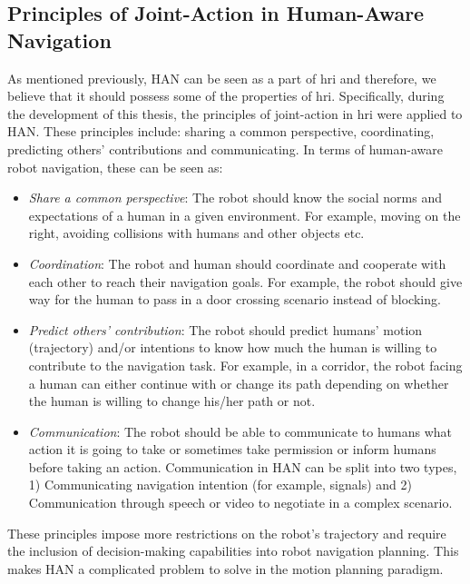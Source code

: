 \subsection{Principles of Joint-Action in Human-Aware Navigation}
As mentioned previously, HAN can be seen as a part of \acrshort{hri} and therefore, we believe that it should possess some of the properties of \acrshort{hri}. Specifically, during the development of this thesis, the principles of joint-action \cite{curioni2019joint} in \acrshort{hri} were applied to HAN. These principles include: sharing a common perspective, coordinating, predicting others' contributions and communicating. In terms of human-aware robot navigation, these can be seen as:
\begin{itemize}[leftmargin=*]
    \item \textit{Share a common perspective}: The robot should know the social norms and expectations of a human in a given environment. For example, moving on the right, avoiding collisions with humans and other objects etc.
    \item \textit{Coordination}: The robot and human should coordinate and cooperate with each other to reach their navigation goals. For example, the robot should give way for the human to pass in a door crossing scenario instead of blocking.
    \item \textit{Predict others' contribution}: The robot should predict humans' motion (trajectory) and/or intentions to know how much the human is willing to contribute to the navigation task. For example, in a corridor, the robot facing a human can either continue with or change its path depending on whether the human is willing to change his/her path or not. 
    \item \textit{Communication}: The robot should be able to communicate to humans what action it is going to take or sometimes take permission or inform humans before taking an action. Communication in HAN can be split into two types, 1) Communicating navigation intention (for example, signals) and 2) Communication through speech or video to negotiate in a complex scenario.
\end{itemize}
These principles impose more restrictions on the robot's trajectory and require the inclusion of decision-making capabilities into robot navigation planning. This makes HAN a complicated problem to solve in the motion planning paradigm. 

